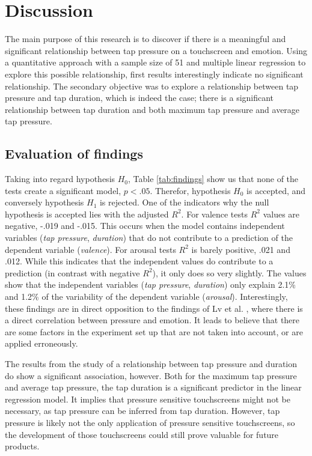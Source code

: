 \documentclass{sigchi}
\begin{document}
\section{Discussion} %
\label{sec:discussion}
The main purpose of this research is to discover if there is a meaningful and significant relationship between tap pressure on a touchscreen and emotion. Using a quantitative approach with a sample size of 51 and multiple linear regression to explore this possible relationship, first results interestingly indicate no significant relationship. The secondary objective was to explore a relationship between tap pressure and tap duration, which is indeed the case; there is a significant relationship between tap duration and both maximum tap pressure and average tap pressure. 

\subsection{Evaluation of findings} %
\label{sub:evaluation_of_findings}
Taking into regard hypothesis $H_0$, Table \ref{tab:findings} show us that none of the tests create a significant model, $p < .05$. Therefor, hypothesis $H_0$ is accepted, and conversely hypothesis $H_1$ is rejected. One of the indicators why the null hypothesis is accepted lies with the adjusted $R^2$. For valence tests $R^2$ values are negative, -.019 and -.015. This occurs when the model contains independent variables (\textit{tap pressure}, \textit{duration}) that do not contribute to a prediction of the dependent variable (\textit{valence}). For arousal tests $R^2$ is barely positive, .021 and .012. While this indicates that the independent values do contribute to a prediction (in contrast with negative $R^2$), it only does so very slightly. The values show that the independent variables (\textit{tap pressure}, \textit{duration}) only explain 2.1\% and 1.2\% of the variability of the dependent variable (\textit{arousal}). Interestingly, these findings are in direct opposition to the findings of Lv et al. \cite{H.R.LvZ.L.LinW.J.Yin2008}, where there is a direct correlation between pressure and emotion. It leads to believe that there are some factors in the experiment set up that are not taken into account, or are applied erroneously.

The results from the study of a relationship between tap pressure and duration do show a significant association, however. Both for the maximum tap pressure and average tap pressure, the tap duration is a significant predictor in the linear regression model. It implies that pressure sensitive touchscreens might not be necessary, as tap pressure can be inferred from tap duration. However, tap pressure is likely not the only application of pressure sensitive touchscreens, so the development of those touchscreens could still prove valuable for future products.
\end{document}
